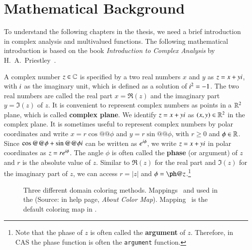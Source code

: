 \section{Mathematical Background}\label{sec:math-background}
To understand the following chapters in the thesis, we need a brief introduction in complex analysis and multivalued functions. The following mathematical introduction is based on the book \textit{Introduction to Complex Analysis} by H.~A.~Priestley~\cite{ComplexAna:Intro}.

A complex number $z \in \mathbb{C}$ is specified by a two real numbers $x$ and $y$ as $z = x+y{i}$, with ${i}$ as the imaginary unit, which is defined as a solution of ${i}^2 = -1$. The two real numbers are called the real part $x = \Re(z)$ and the imaginary part $y = \Im(z)$ of $z$. It is convenient to represent complex numbers as points in a $\mathbb{R}^2$ plane, which is called \textbf{complex plane}. We identify $z = x+y{i}$ as $(x,y) \in \mathbb{R}^2$ in the complex plane. It is sometimes useful to represent complex numbers by polar coordinates and write $x = r\cos@@{\phi}$ and $y = r\sin@@{\phi}$, with $r \geq 0$ and $\phi \in \mathbb{R}$. Since $\cos@@{\phi}+\sin@@{\phi}\iunit$ can be written as ${e}^{{i}\phi}$, we write $z = x+y{i}$ in polar coordinates as $z = r{e}^{{i}\phi}$. The angle $\phi$ is often called the \textbf{phase} (or argument) of $z$ and $r$ is the absolute value of $z$. Similar to $\Re(z)$ for the real part and $\Im(z)$ for the imaginary part of $z$, we can access $r = |z|$ and $\phi = \ph@{z}$.\footnote{Note that the phase of $z$ is often called the \textbf{argument} of $z$. Therefore, in CAS the phase function is often the \texttt{argument} function.}

\begin{figure}[ht]
    \centering
    \hspace{0.4cm}
    \hspace{0.4cm}
    \caption{Three different domain coloring methods. Mappings~\protect{} and \protect{} used in the \DLMF{} (Source: \DLMF{~}\cite{NIST:DLMF} in help page, \textit{About Color Map}). Mapping~\protect{} is the default coloring map in \Maple.}
    \label{fig:domain-coloring}
\end{figure}

